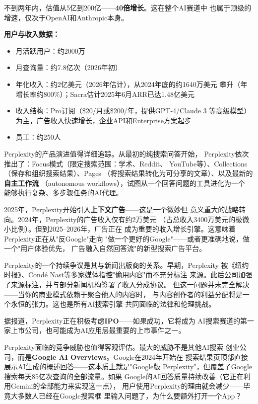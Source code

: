 不到两年内，估值从5亿到200亿——\textbf{40倍增长}。这在整个AI赛道中
也属于顶级的增速，仅次于OpenAI和Anthropic本身。

\textbf{用户与收入数据：}

\begin{itemize}
  \item 月活跃用户：约2000万
  \item 月查询量：约7.8亿次（2026年初）
  \item 年化收入：约2亿美元（2026年估计），从2024年底的约1640万美元
    攀升（年增长率约800\%）；Sacra估计2025年6月ARR已达1.48亿美元
  \item 收入结构：Pro订阅（\$20/月或\$200/年，提供GPT-4/Claude 3
    等高级模型）为主，广告收入快速增长，企业API和Enterprise方案起步
  \item 员工：约250人
\end{itemize}

Perplexity的产品演进值得详细追踪。从最初的纯搜索问答开始，
Perplexity依次推出了：Focus模式（限定搜索范围：学术、Reddit、
YouTube等）、Collections（保存和组织搜索结果）、Pages
（将搜索结果转化为可分享的文章）、以及最新的\textbf{自主工作流}
（autonomous workflows），试图从一个回答问题的工具进化为一个
能够执行复杂、多步骤任务的AI代理。

2025年，Perplexity开始引入\textbf{上下文广告}——这是一个微妙但
意义重大的战略转向。2024年，Perplexity的广告收入仅有约2万美元
（占总收入3400万美元的极微小比例）。但到2025--2026年，广告正在
成为重要的收入增长引擎。这意味着Perplexity正在从"反Google"走向
"做一个更好的Google"——或者更准确地说，做一个"用户体验优先，
广告融入自然回答流"的新型搜索广告平台。

Perplexity的一个持续争议是其与新闻出版商的关系。早期，Perplexity
被《纽约时报》、Condé Nast等多家媒体指控"偷用内容"而不充分标注
来源。此后公司加强了来源标注，并与部分新闻机构签署了收入分成协议。
但这一问题并未完全解决——当你的商业模式依赖于聚合他人的内容时，
与内容创作者的利益分配将是一个永恒的张力。这也是所有AI搜索引擎
共同面临的法律和伦理挑战。

据报道，Perplexity正在积极考虑\textbf{IPO}——如果成功，它将成为
AI搜索赛道的第一家上市公司，也可能成为AI应用层最重要的上市事件之一。

Perplexity面临的竞争威胁也值得客观评估。最大的威胁不是其他AI搜索
创业公司，而是\textbf{Google AI Overviews}。Google在2024年开始在
搜索结果页顶部直接展示AI生成的概述回答——这本质上就是"Google版
Perplexity"，但覆盖了Google搜索每天85亿次查询的全部流量。如果
Google的AI回答质量持续改善（它正在利用Gemini的全部能力来实现这一点），
用户使用Perplexity的理由就会减少——毕竟大多数人已经在Google搜索框
里输入问题了，为什么要额外打开一个App？

